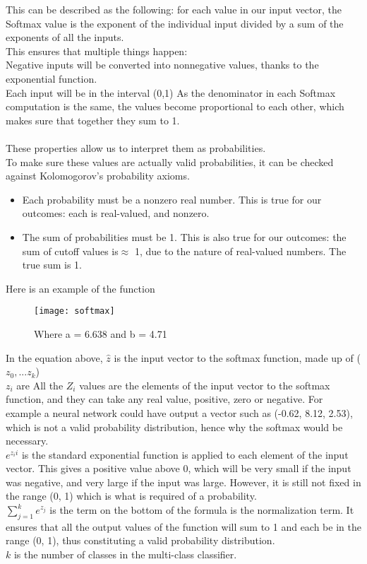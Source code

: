 \documentclass{article}
\begin{document}
\begin{itemize}
\begin{itemize}
This can be described as the following: for each value in our input vector, the Softmax value is the exponent of the individual input divided by a sum of the exponents of all the inputs.
\\
This ensures that multiple things happen:
\\
Negative inputs will be converted into nonnegative values, thanks to the exponential function.\\
Each input will be in the interval (0,1)
As the denominator in each Softmax computation is the same, the values become proportional to each other, which makes sure that together they sum to 1.\\
\\
These properties allow us to interpret them as probabilities.
\\
To make sure these values are actually valid probabilities, it can be checked against Kolomogorov’s probability axioms.
\begin{itemize}
    \item Each probability must be a nonzero real number. This is true for our outcomes: each is real-valued, and nonzero.
    \item The sum of probabilities must be 1. This is also true for our outcomes: the sum of cutoff values is$\approx$ 1, due to the nature of real-valued numbers. The true sum is 1.
\end{itemize}
Here is an example of the function
\begin{figure}[h!]
            \centering
            \texttt{[image: softmax]}
            \caption{Where a = 6.638 and b = 4.71}
        \end{figure}
        \end{itemize}
        In the equation above, $\hat{z}$ is the input vector to the softmax function, made up of ($z_0, ... z_k$)\\
        $z_i$ are All the $Z_i$ values are the elements of the input vector to the softmax function, and they can take any real value, positive, zero or negative. For example a neural network could have output a vector such as (-0.62, 8.12, 2.53), which is not a valid probability distribution, hence why the softmax would be necessary.\\
        $e^{z_ii}$ is the  standard exponential function is applied to each element of the input vector. This gives a positive value above 0, which will be very small if the input was negative, and very large if the input was large. However, it is still not fixed in the range (0, 1) which is what is required of a probability.\\
$\sum_{j=1}^{k}{e^{z_j}}$ is the term on the bottom of the formula is the normalization term. It ensures that all the output values of the function will sum to 1 and each be in the range (0, 1), thus constituting a valid probability distribution.\\
        $k$ is the number of classes in the multi-class classifier.
\end{itemize}
\end{document}
